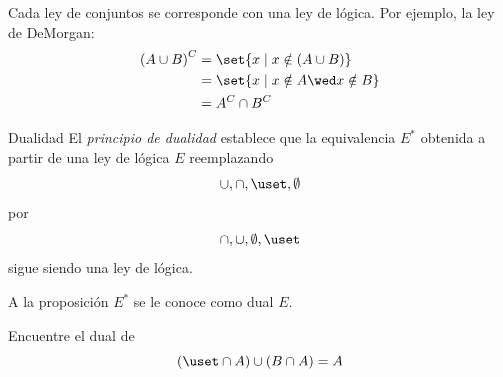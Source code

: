 	Cada ley de conjuntos se corresponde con una ley de lógica. Por ejemplo, la ley de DeMorgan:
	\begin{align}
		\left(A \cup B\right)^{C} &= \set{x \mid x\notin(A \cup B)}\\
		&= \set{x \mid x\notin A \wed x\notin B}\\
		&=A^{C}\cap B^{C}
	\end{align}



	{Dualidad}
	El \emph{principio de dualidad} establece que la equivalencia $E^{*}$ obtenida a partir de una ley de lógica $E$ reemplazando
	\begin{equation} \cup, \cap, \uset, \emptyset\end{equation} por
	\begin{equation} \cap, \cup, \emptyset, \uset\end{equation}
	sigue siendo una ley de lógica.
	
	
	A la proposición $E^{*}$ se le conoce como dual $E.$



	\begin{problema}
		Encuentre el dual de 
		\begin{equation} (\uset \cap A) \cup (B\cap A) = A\end{equation}
	\end{problema}


